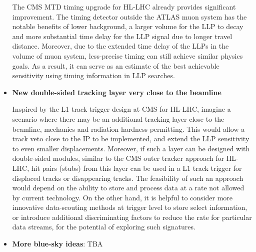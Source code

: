 \begin{itemize}
The CMS MTD timing upgrade for HL-LHC already provides significant improvement. 
The timing detector outside the ATLAS muon system has the notable benefits of lower background, a larger volume for the LLP to decay and more substantial time delay for the LLP signal due to longer travel distance. 
Moreover, due to the extended time delay of the LLPs in the volume of muon system, less-precise timing can still achieve similar physics goals.  As a result, it can serve as an estimate of the best achievable sensitivity using timing information in LLP searches. 

\item \textbf{New double-sided tracking layer very close to the beamline}

Inspired by the L1 track trigger design at CMS for HL-LHC, imagine a scenario where there may be an additional tracking layer close to the beamline, mechanics and radiation hardness permitting. 
This would allow a track veto close to the IP to be implemented, and extend the LLP sensitivity to even smaller displacements. 
Moreover, if such a layer can be designed with double-sided modules, similar to the CMS outer tracker approach for HL-LHC, hit pairs (stubs) from this layer can be used in a L1 track trigger for displaced tracks or disappearing tracks. 
The feasibility of such an approach would depend on the ability to store and process data at a rate not allowed by current technology. 
On the other hand, it is helpful to consider more innovative data-scouting methods at trigger level to store select information, or introduce additional discriminating factors to reduce the rate for particular data streams, for the potential of exploring such signatures. 

\item \textbf{More blue-sky ideas}: TBA


\end{itemize}
